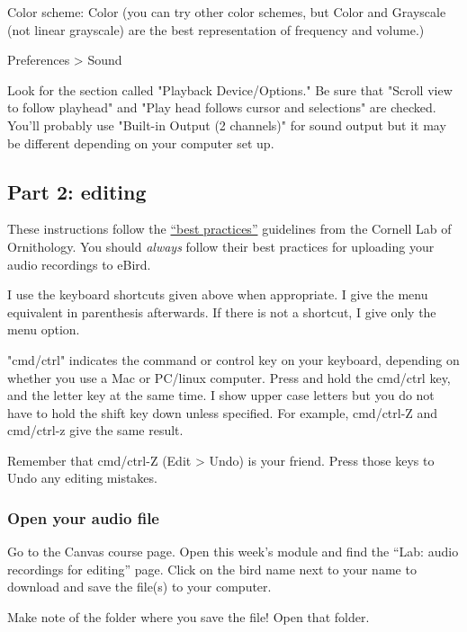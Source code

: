 \documentclass[12pt]{article}
\begin{document}
Color scheme: Color (you can try other color schemes, but Color and Grayscale (not linear grayscale) are the best representation of frequency and volume.)

\vspace{\baselineskip}

Preferences > Sound

Look for the section called "Playback Device/Options." Be sure that "Scroll view to follow playhead" and "Play head follows cursor and selections" are checked. You'll probably use "Built-in Output (2 channels)" for sound output but it may be different depending on your computer set up.



\subsection*{Part 2: editing}

These instructions follow the \href{https://support.ebird.org/en/support/solutions/articles/48001064341}{“best practices”} guidelines from the Cornell Lab of Ornithology. You should \emph{always} follow their best practices for uploading your audio recordings to eBird.


I use the keyboard shortcuts given above when appropriate. I give the menu equivalent in parenthesis afterwards. If there is not a shortcut, I give only the menu option.

"cmd/ctrl" indicates the command or control key on your keyboard, depending on whether you use a Mac or PC/linux computer. Press and hold the cmd/ctrl key, and the letter key at the same time. I show upper case letters but you do not have to hold the shift key down unless specified. For example, cmd/ctrl-Z and cmd/ctrl-z give the same result.


Remember that cmd/ctrl-Z (Edit > Undo) is your friend. Press those keys to Undo any editing mistakes.


\subsubsection*{Open your audio file}

Go to the Canvas course page. Open this week's module and find the “Lab: audio recordings for editing” page. Click on the bird name next to your name to download and save the file(s) to your computer.

Make note of the folder where you save the file! Open that folder.
\end{document}
